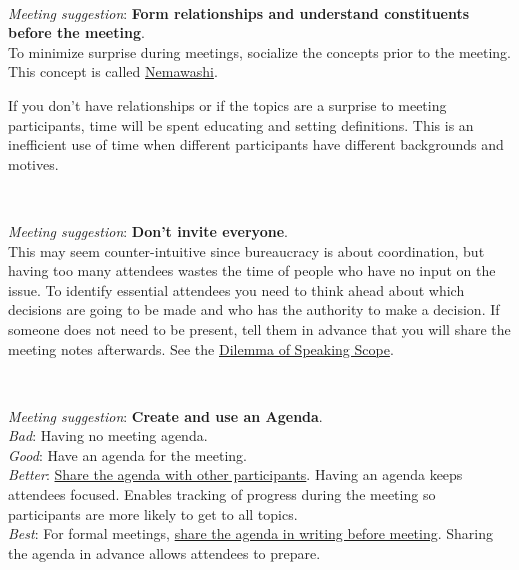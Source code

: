 \ \\
\begin{samepage}
\textit{Meeting suggestion}: \textbf{Form relationships and understand constituents before the meeting}.\\
To minimize surprise during meetings, socialize the concepts prior to the meeting. This concept is called 
\href{https://en.wikipedia.org/wiki/Nemawashi}{Nemawashi}.
\iftoggle{WPinmargin}{\marginpar{[Wikipedia] Nemawashi}}{}
\end{samepage}

If you don't have relationships or if the topics are a surprise to meeting participants, time will be spent educating and setting definitions. This is an inefficient use of time when different participants have different backgrounds and motives.

\ \\
\begin{samepage}
\textit{Meeting suggestion}: \textbf{Don't invite everyone}.\\
This may seem counter-intuitive since bureaucracy is about coordination, but having too many attendees wastes the time of people who have no input on the issue. 
To identify essential attendees you need to think ahead about which decisions are going to be made and who has the authority to make a decision. If someone does not need to be present, tell them in advance that you will share the meeting notes afterwards. See the \hyperref[table:dilemma-personal-scope-of-speaking]{Dilemma of Speaking Scope}.
\end{samepage}

\ \\
\begin{samepage}
\textit{Meeting suggestion}: \textbf{Create and use an Agenda}.\\
\textit{Bad}: Having no meeting agenda.\\
\textit{Good}: Have an agenda for the meeting. \\
\textit{Better}: \underline{Share the agenda with other participants}. Having an agenda keeps attendees focused.  Enables tracking of progress during the meeting so participants are more likely to get to all topics.\\
\textit{Best}: For formal meetings, \underline{share the agenda in writing before meeting}. Sharing the agenda in advance allows attendees to prepare.
\end{samepage}

